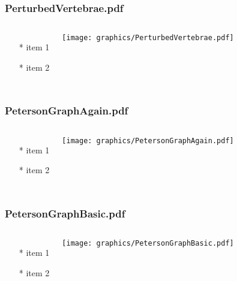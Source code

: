 \documentclass{beamer}
\begin{document}
\begin{frame} \frametitle{PerturbedVertebrae.pdf}
    \begin{columns}[c]
        \begin{itemize}
            \item[*] item 1
            \item[*] item 2
        \end{itemize}
        \begin{minipage}{\linewidth}
            \begin{center}
            \texttt{[image: graphics/PerturbedVertebrae.pdf]}
            \label{gfx:PerturbedVertebrae.pdf}
            \end{center}
        \end{minipage}
    \end{columns}
\end{frame}
\begin{frame} \frametitle{PetersonGraphAgain.pdf}
    \begin{columns}[c]
        \begin{itemize}
            \item[*] item 1
            \item[*] item 2
        \end{itemize}
        \begin{minipage}{\linewidth}
            \begin{center}
            \texttt{[image: graphics/PetersonGraphAgain.pdf]}
            \label{gfx:PetersonGraphAgain.pdf}
            \end{center}
        \end{minipage}
    \end{columns}
\end{frame}
\begin{frame} \frametitle{PetersonGraphBasic.pdf}
    \begin{columns}[c]
        \begin{itemize}
            \item[*] item 1
            \item[*] item 2
        \end{itemize}
        \begin{minipage}{\linewidth}
            \begin{center}
            \texttt{[image: graphics/PetersonGraphBasic.pdf]}
            \label{gfx:PetersonGraphBasic.pdf}
            \end{center}
        \end{minipage}
    \end{columns}
\end{frame}
\end{document}
